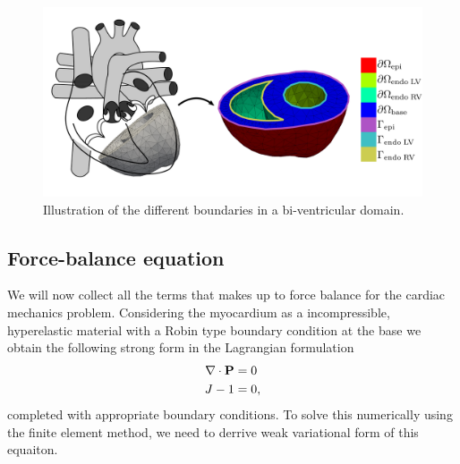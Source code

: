 \begin{figure}[htbp]
  \centering
    \includegraphics[width=\textwidth]{chapters/introduction/figures/boundaries}
\caption{Illustration of the different boundaries in a bi-ventricular
  domain.}
\label{fig:boundaries}
\end{figure}


\subsection{Force-balance equation}
We will now collect all the terms that makes up to force balance for
the cardiac mechanics problem. Considering the myocardium as a incompressible,
hyperelastic material with a Robin type boundary condition at the base
we obtain the following strong form in the Lagrangian formulation
\begin{align}
  \begin{split}
  \nabla \cdot \mathbf{P} &= 0 \\
  J - 1 &= 0,
  \end{split}
 \label{eq:force_balance_strong}
\end{align}
completed with appropriate boundary conditions. To solve this
numerically using the finite element method, we need to derrive weak
variational form of this equaiton.
 


